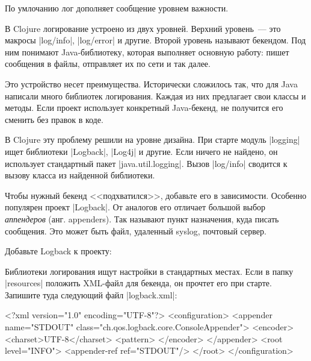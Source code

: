 \noindent
По умлочанию лог дополняет сообщение уровнем важности.

В Clojure логирование устроено из двух уровней. Верхний уровень~--- это макросы
\spverb|log/info|, \spverb|log/error| и другие. Второй уровень называют
бекендом. Под ним понимают Java-библиотеку, которая выполняет основную работу:
пишет сообщения в файлы, отправляет их по сети и так далее.

Это устройство несет преимущества. Исторически сложилось так, что для Java
написали много библиотек логирования. Каждая из них предлагает свои классы и
методы. Если проект использует конкретный Java-бекенд, не получится его сменить
без правок в коде.

В Clojure эту проблему решили на уровне дизайна. При старте модуль
\spverb|logging| ищет библиотеки \spverb|Logback|, \spverb|Log4j| и другие. Если
ничего не найдено, он использует стандартный пакет
\spverb|java.util.logging|. Вызов \spverb|log/info| сводится к вызову класса из
найденной библиотеки.

Чтобы нужный бекенд <<подхватился>>, добавьте его в зависимости. Особенно
популярен проект \spverb|Logback|. От аналогов его отличает большой выбор
\emph{аппендеров} (анг. appenders). Так называют пункт назначения, куда писать
сообщения. Это может быть файл, удаленный syslog, почтовый сервер.

Добавьте Logback к проекту:

\begin{english}
  \begin{clojure}
  \end{clojure}
\end{english}

Библиотеки логирования ищут настройки в стандартных местах. Если в папку
\spverb|resources| положить XML-файл для бекенда, он прочтет его при
старте. Запишите туда следующий файл \spverb|logback.xml|:

\begin{english}
  \begin{xml}
<?xml version="1.0" encoding="UTF-8"?>
<configuration>
  <appender name="STDOUT" class="ch.qos.logback.core.ConsoleAppender">
    <encoder>
      <charset>UTF-8</charset>
      <pattern>%
    </encoder>
  </appender>
  <root level="INFO">
    <appender-ref ref="STDOUT"/>
  </root>
</configuration>
  \end{xml}
\end{english}

